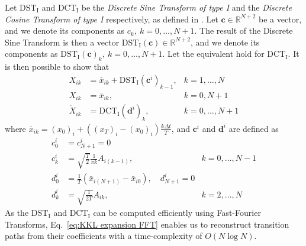 Let $\text{DST}_\text{I}$ and $\text{DCT}_\text{I}$ be the \textit{Discrete Sine Transform of type I} and the \textit{Discrete Cosine Transform of type I} respectively, as defined in \citep{makhoulFastCosineTransform1980, ahmedDiscreteCosineTransform1974}. Let $\mathbf{c} \in \mathbb{R}^{N+2}$ be a vector, and we denote its components as $c_k,\ k=0,\dots, N+1$. The result of the Discrete Sine Transform is then a vector $\text{DST}_\text{I}(\mathbf{c}) \in \mathbb{R}^{N+2}$, and we denote its components as $\text{DST}_\text{I}(\mathbf{c})_k,\ k=0, \dots, N+1$. Let the equivalent hold for $\text{DCT}_\text{I}$. It is then possible to show that
\begin{subequations} \label{eq:KKL expansion FFT}
	\begin{align}
	X_{ik} & = \bar{x}_{ik} + \text{DST}_\text{I} ( \mathbf{c}^i )_{k-1}, & k=1,\dots,N \\
	X_{ik} & = \bar{x}_{ik}, & k=0, N+1 \\
	\dot{X}_{ik} & = \text{DCT}_\text{I} ( \mathbf{d}^i )_k, & k=0,\dots,N+1
	\end{align}
\end{subequations}
where $\bar{x}_{ik} = (x_0)_i + ( (x_T)_i - (x_0)_i) \frac{ k \Delta t}{T}$, and $\mathbf{c}^i$ and $\mathbf{d}^i$ are defined as
\begin{subequations}
	\begin{align}
	c^i_0 & = c^i_{N+1} = 0 \\
	c^i_k & = \sqrt{\frac{T}{2}} \frac{1}{\pi k} A_{i(k-1)}, & k =0,\dots,N-1 \\
	d^i_0 & = \frac{1}{T} ( \bar{x}_{i(N+1)} - \bar{x}_{i0} ), \quad d^i_{N+1} = 0 \\
	d^i_k & = \sqrt{\frac{1}{2 T}} A_{ik}, & k=2,\dots,N 
	\end{align}
\end{subequations}
As the $\text{DST}_\text{I}$ and $\text{DCT}_\text{I}$ can be computed efficiently using Fast-Fourier Transforms, Eq.~\ref{eq:KKL expansion FFT} enables us to reconstruct transition paths from their coefficients with a time-complexity of $O(N \log N)$. 

